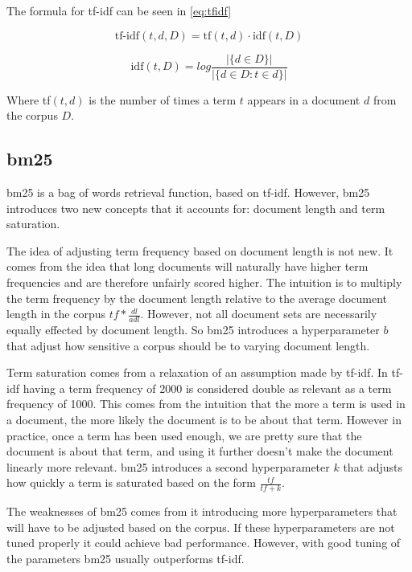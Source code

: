 The formula for \gls{tf-idf} can be seen in \autoref{eq:tfidf}

\begin{equation}\label{eq:tfidf}
	\text{tf-idf}(t, d, D) = \text{tf}(t, d) \cdot \text{idf}(t, D)
\end{equation}

\begin{equation}\label{eq:idf}
	\text{idf}(t,D) = log \frac{|\{d \in D\}|}{|\{d \in D : t \in d\}|}
\end{equation}
	
Where tf$(t, d)$ is the number of times a term $t$ appears in a document $d$ from the corpus $D$.


\subsection{\acrlong{bm25}}
\gls{bm25} is a bag of words retrieval function, based on \gls{tf-idf}.
However, \gls{bm25} introduces two new concepts that it accounts for: document length and term saturation.

The idea of adjusting term frequency based on document length is not new. It comes from the idea that long documents will naturally have higher term frequencies and are therefore unfairly scored higher.
The intuition is to multiply the term frequency by the document length relative to the average document length in the corpus $tf * \frac{dl}{adl}$.
However, not all document sets are necessarily equally effected by document length.
So \gls{bm25} introduces a hyperparameter $b$ that adjust how sensitive a corpus should be to varying document length.

Term saturation comes from a relaxation of an assumption made by \gls{tf-idf}.
In \gls{tf-idf} having a term frequency of 2000 is considered double as relevant as a term frequency of 1000.
This comes from the intuition that the more a term is used in a document, the more likely the document is to be about that term.
However in practice, once a term has been used enough, we are pretty sure that the document is about that term, and using it further doesn't make the document linearly more relevant.
\gls{bm25} introduces a second hyperparameter $k$ that adjusts how quickly a term is saturated based on the form $\frac{tf}{tf+k}$.

The weaknesses of \gls{bm25} comes from it introducing more hyperparameters that will have to be adjusted based on the corpus.
If these hyperparameters are not tuned properly it could achieve bad performance.
However, with good tuning of the parameters \gls{bm25} usually outperforms \gls{tf-idf}.

